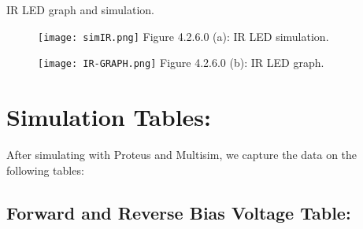 \documentclass[10pt,a4paper]{article}
\begin{document}
IR LED graph and simulation.

\begin{figure}[H]
\texttt{[image: simIR.png]}
\centering \linebreak \linebreak Figure 4.2.6.0 (a): IR LED simulation.
\end{figure}

\begin{figure}[H]
\texttt{[image: IR-GRAPH.png]}
\centering \linebreak \linebreak Figure 4.2.6.0 (b): IR LED graph.
\end{figure}

\pagebreak

\section{Simulation Tables:}

After simulating with Proteus and Multisim, we capture the data on the following tables:

\subsection{Forward and Reverse Bias Voltage Table:}
\end{document}
